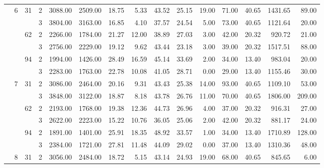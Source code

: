 \begin{tabular}{llllrrrrrrrrrrr}
\cline{2-15}
\cline{3-15}
                & \multirow{6}{*}{6} & \multirow{2}{*}{31} & 2 &  3088.00 &   2509.00 & 18.75 &    5.33 &   43.52 &   25.15 &   19.00 &   71.00 &   40.65 & 1431.65 &    89.00 \\
                &   &    & 3 &  3804.00 &   3163.00 & 16.85 &    4.10 &   37.57 &   24.54 &    5.00 &   73.00 &   40.65 & 1121.64 &    20.00 \\
\cline{3-15}
                &   & \multirow{2}{*}{62} & 2 &  2266.00 &   1784.00 & 21.27 &   12.00 &   38.89 &   27.03 &    3.00 &   42.00 &   20.32 &  920.72 &    21.00 \\
                &   &    & 3 &  2756.00 &   2229.00 & 19.12 &    9.62 &   43.44 &   23.18 &    3.00 &   39.00 &   20.32 & 1517.51 &    88.00 \\
\cline{3-15}
                &   & \multirow{2}{*}{94} & 2 &  1994.00 &   1426.00 & 28.49 &   16.59 &   45.14 &   33.69 &    2.00 &   34.00 &   13.40 &  983.04 &    20.00 \\
                &   &    & 3 &  2283.00 &   1763.00 & 22.78 &   10.08 &   41.05 &   28.71 &    0.00 &   29.00 &   13.40 & 1155.46 &    30.00 \\
\cline{2-15}
\cline{3-15}
                & \multirow{6}{*}{7} & \multirow{2}{*}{31} & 2 &  3086.00 &   2464.00 & 20.16 &    9.31 &   43.43 &   25.38 &   14.00 &   93.00 &   40.65 & 1109.10 &    53.00 \\
                &   &    & 3 &  3848.00 &   3122.00 & 18.87 &    8.18 &   43.78 &   26.76 &   11.00 &   70.00 &   40.65 & 1806.00 &   209.00 \\
\cline{3-15}
                &   & \multirow{2}{*}{62} & 2 &  2193.00 &   1768.00 & 19.38 &   12.36 &   44.73 &   26.96 &    4.00 &   37.00 &   20.32 &  916.31 &    27.00 \\
                &   &    & 3 &  2622.00 &   2223.00 & 15.22 &   10.76 &   36.05 &   25.06 &    2.00 &   42.00 &   20.32 &  881.17 &    24.00 \\
\cline{3-15}
                &   & \multirow{2}{*}{94} & 2 &  1891.00 &   1401.00 & 25.91 &   18.35 &   48.92 &   33.57 &    1.00 &   34.00 &   13.40 & 1710.89 &   128.00 \\
                &   &    & 3 &  2384.00 &   1721.00 & 27.81 &   11.48 &   44.09 &   29.02 &    0.00 &   37.00 &   13.40 & 1310.36 &    48.00 \\
\cline{2-15}
\cline{3-15}
                & \multirow{6}{*}{8} & \multirow{2}{*}{31} & 2 &  3056.00 &   2484.00 & 18.72 &    5.15 &   43.14 &   24.93 &   19.00 &   68.00 &   40.65 &  845.65 &     6.00 \\

\end{tabular}
